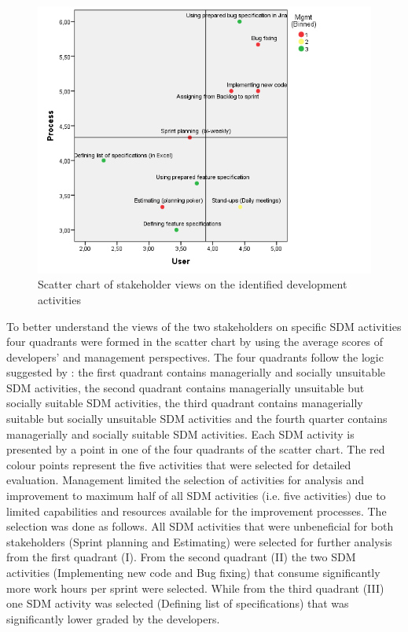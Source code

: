 \begin{figure}
	\centering
	\includegraphics[width=\linewidth]{figures/survey-scatter-plot}
	\caption{Scatter chart of stakeholder views on the identified development activities}
	\label{fig:survey-scatter-plot}
\end{figure}


To better understand the views of the two stakeholders on specific SDM activities four quadrants were formed in the scatter chart by using the average scores of developers’ and management perspectives. The four quadrants follow the logic suggested by \cite{DBLP:journals/comsis/VavpoticH12}: the first quadrant contains managerially and socially unsuitable SDM activities, the second quadrant contains managerially unsuitable but socially suitable SDM activities, the third quadrant contains managerially suitable but socially unsuitable SDM activities and the fourth quarter contains managerially and socially suitable SDM activities. Each SDM activity is presented by a point in one of the four quadrants of the scatter chart. The red colour points represent the five activities that were selected for detailed evaluation. Management limited the selection of activities for analysis and improvement to maximum half of all SDM activities (i.e. five activities) due to limited capabilities and resources available for the improvement processes. The selection was done as follows. All SDM activities that were unbeneficial for both stakeholders (Sprint planning and Estimating) were selected for further analysis from the first quadrant (I). From the second quadrant (II) the two SDM activities (Implementing new code and Bug fixing) that consume significantly more work hours per sprint were selected. While from the third quadrant (III) one SDM activity was selected (Defining list of specifications) that was significantly lower graded by the developers.

